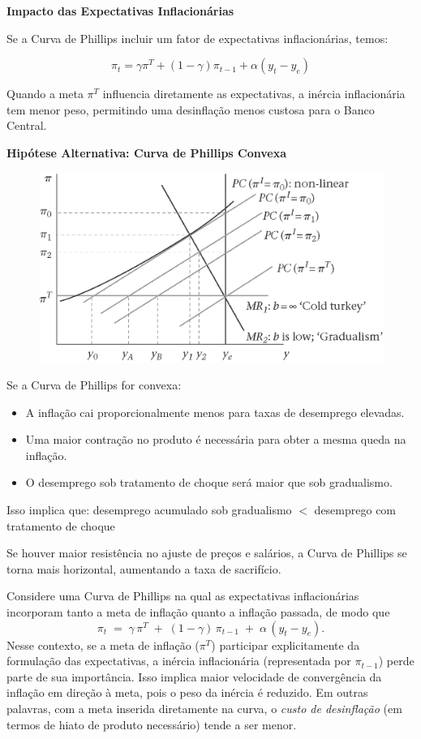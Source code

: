 \documentclass[a4paper,12pt]{article}[abntex2]
\begin{document}
\textbf{Impacto das Expectativas Inflacionárias}

Se a Curva de Phillips incluir um fator de expectativas inflacionárias, temos:

\[
\pi_t = \gamma \pi^T + (1 - \gamma) \pi_{t-1} + \alpha (y_t - y_e)
\]

Quando a meta \( \pi^T \) influencia diretamente as expectativas, a inércia inflacionária tem menor peso, permitindo uma desinflação menos custosa para o Banco Central.

\textbf{Hipótese Alternativa: Curva de Phillips Convexa}

\begin{figure}[H]
    \centering
    \includegraphics[width=0.7\linewidth]{Imagens/a13i6.png}
\end{figure}

Se a Curva de Phillips for convexa:

\begin{itemize}
    \item A inflação cai proporcionalmente menos para taxas de desemprego elevadas.
    \item Uma maior contração no produto é necessária para obter a mesma queda na inflação.
    \item O desemprego sob tratamento de choque será maior que sob gradualismo.
\end{itemize}

Isso implica que: desemprego acumulado sob gradualismo \(<\) desemprego com tratamento de choque

Se houver maior resistência no ajuste de preços e salários, a Curva de Phillips se torna mais horizontal, aumentando a taxa de sacrifício.

Considere uma Curva de Phillips na qual as expectativas inflacionárias incorporam tanto a meta de inflação quanto a inflação passada, de modo que
\[
\pi_t \;=\; \gamma \,\pi^T \;+\; (1-\gamma)\,\pi_{t-1} \;+\; \alpha \,(y_t - y_e).
\]
Nesse contexto, se a meta de inflação (\(\pi^T\)) participar explicitamente da formulação das expectativas, a inércia inflacionária (representada por \(\pi_{t-1}\)) perde parte de sua importância. Isso implica maior velocidade de convergência da inflação em direção à meta, pois o peso da inércia é reduzido. Em outras palavras, com a meta inserida diretamente na curva, o \emph{custo de desinflação} (em termos de hiato de produto necessário) tende a ser menor.
\end{document}
